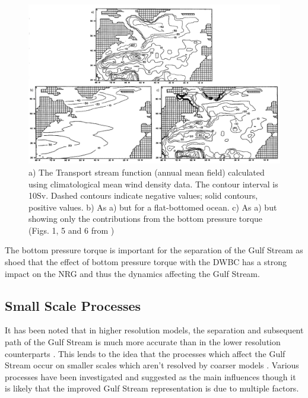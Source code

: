 \documentclass[..\EOYR.tex]{subfiles}
\begin{document}
\begin{figure}[t]
    \includegraphics[width=\linewidth]{Figures/Greatbatch1991Fig1Fig5Fig6.jpg}
    \caption{a) The Transport stream function (annual mean field) calculated using climatological mean wind density data. The contour interval is 10Sv. Dashed contours indicate negative values; solid contours, positive values. b) As a) but for a flat-bottomed ocean. c) As a) but showing only the contributions from the bottom pressure torque (Figs. 1, 5 and 6 from \citep{Greatbatch1991})}
    \label{FIG:Greatbatch1991Fig1Fig5Fig6}
\end{figure}



The bottom pressure torque is important for the separation of the Gulf Stream as \citep{Zhang2007} shoed that the effect of bottom pressure torque with the DWBC has a strong impact on the NRG and thus the dynamics affecting the Gulf Stream.









\subsection{Small Scale Processes}

It has been noted that in higher resolution models, the separation and subsequent path of the Gulf Stream is much more accurate than in the lower resolution counterparts \citep{Hurlburt2008}\citep{Zhang2007}. This lends to the idea that the processes which affect the Gulf Stream occur on smaller scales which aren't resolved by coarser models \citep{NaveiraGarabato2013}\citep{Nikurashin2012a}. Various processes have been investigated and suggested as the main influences though it is likely that the improved Gulf Stream representation is due to multiple factors.
\end{document}
